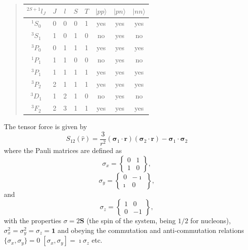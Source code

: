 \documentclass[%
oneside,                 %
final,                   %
10pt]{article}
\begin{document}
\begin{quote}
\begin{tabular}{cccccccc}
\hline
\multicolumn{1}{c}{ $^{2S+1}l_J$ } & \multicolumn{1}{c}{ $J$ } & \multicolumn{1}{c}{ $l$ } & \multicolumn{1}{c}{ $S$ } & \multicolumn{1}{c}{ $T$ } & \multicolumn{1}{c}{ $\vert pp\rangle$ } & \multicolumn{1}{c}{ $\vert pn\rangle$ } & \multicolumn{1}{c}{ $\vert nn\rangle$ } \\
\hline
$^{1}S_0$    & 0   & 0   & 0   & 1   & yes               & yes               & yes               \\
$^{3}S_1$    & 1   & 0   & 1   & 0   & no                & yes               & no                \\
$^{3}P_0$    & 0   & 1   & 1   & 1   & yes               & yes               & yes               \\
$^{1}P_1$    & 1   & 1   & 0   & 0   & no                & yes               & no                \\
$^{3}P_1$    & 1   & 1   & 1   & 1   & yes               & yes               & yes               \\
$^{3}P_2$    & 2   & 1   & 1   & 1   & yes               & yes               & yes               \\
$^{3}D_1$    & 1   & 2   & 1   & 0   & no                & yes               & no                \\
$^{3}F_2$    & 2   & 3   & 1   & 1   & yes               & yes               & yes               \\
\hline
\end{tabular}
\end{quote}

\noindent
The tensor force is given by
\[
S_{12} (\hat r) = \frac{3}{r^2}\left(\mathbf{\sigma}_1\cdot \mathbf{r}\right) \left(\mathbf{\sigma}_2\cdot \mathbf{r}\right) -\mathbf{\sigma}_1\cdot\mathbf{\sigma}_2\]
where the Pauli matrices are defined as
\[
\sigma_x =\begin{Bmatrix} 0 & 1 \\ 1 & 0 \end{Bmatrix},
\]
\[
\sigma_y =\begin{Bmatrix} 0 & -\imath \\ \imath & 0 \end{Bmatrix},
\]
and
\[
\sigma_z =\begin{Bmatrix} 1 & 0 \\ 0 & -1 \end{Bmatrix},
\]
with the properties $\sigma = 2\mathbf{S}$ (the spin of the system, being $1/2$ for nucleons), 
$\sigma^2_x=\sigma^2_y=\sigma_z=\mathbf{1}$ and
obeying the commutation and anti-commutation relations $\{\sigma_x,\sigma_y\} =0$
$[\sigma_x,\sigma_y] =\imath\sigma_z$ etc.
\end{document}
